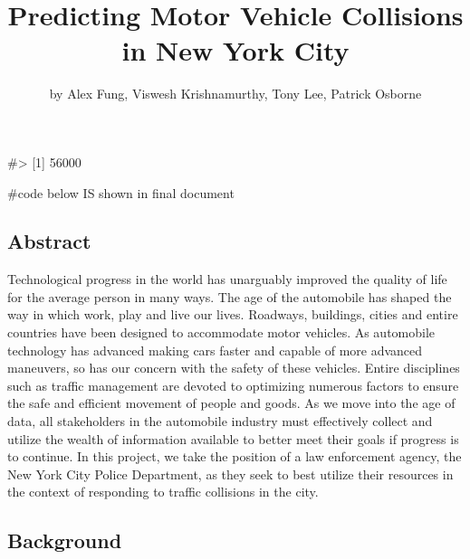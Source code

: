 \title{Predicting Motor Vehicle Collisions in New York City}
\author{by Alex Fung, Viswesh Krishnamurthy, Tony Lee, Patrick Osborne}

\maketitle


\begin{Schunk}
\begin{Soutput}
#> [1] 56000
\end{Soutput}
\end{Schunk}

\begin{Schunk}
\begin{Sinput}
#code below IS shown in final document
\end{Sinput}
\end{Schunk}

\hypertarget{abstract}{%
\subsection{Abstract}\label{abstract}}

Technological progress in the world has unarguably improved the quality
of life for the average person in many ways. The age of the automobile
has shaped the way in which work, play and live our lives. Roadways,
buildings, cities and entire countries have been designed to accommodate
motor vehicles. As automobile technology has advanced making cars faster
and capable of more advanced maneuvers, so has our concern with the
safety of these vehicles. Entire disciplines such as traffic management
are devoted to optimizing numerous factors to ensure the safe and
efficient movement of people and goods. As we move into the age of data,
all stakeholders in the automobile industry must effectively collect and
utilize the wealth of information available to better meet their goals
if progress is to continue. In this project, we take the position of a
law enforcement agency, the New York City Police Department, as they
seek to best utilize their resources in the context of responding to
traffic collisions in the city.

\hypertarget{background}{%
\subsection{Background}\label{background}}

